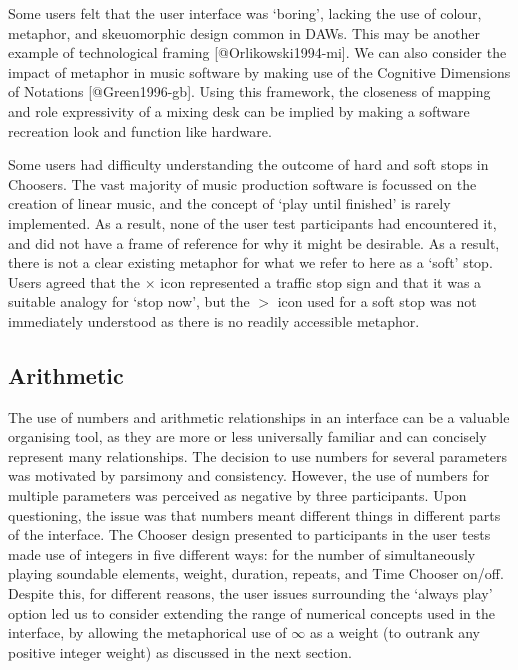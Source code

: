 \documentclass[]{article}
\begin{document}
Some users felt that the user interface was `boring', lacking the use of
colour, metaphor, and skeuomorphic design common in DAWs. This may be
another example of technological framing {[}@Orlikowski1994-mi{]}. We
can also consider the impact of metaphor in music software by making use
of the Cognitive Dimensions of Notations {[}@Green1996-gb{]}. Using this
framework, the closeness of mapping and role expressivity of a mixing
desk can be implied by making a software recreation look and function
like hardware.

Some users had difficulty understanding the outcome of hard and soft
stops in Choosers. The vast majority of music production software is
focussed on the creation of linear music, and the concept of `play until
finished' is rarely implemented. As a result, none of the user test
participants had encountered it, and did not have a frame of reference
for why it might be desirable. As a result, there is not a clear
existing metaphor for what we refer to here as a `soft' stop. Users
agreed that the \(\times\) icon represented a traffic stop sign and that
it was a suitable analogy for `stop now', but the \(>\) icon used for a
soft stop was not immediately understood as there is no readily
accessible metaphor.

\hypertarget{sec:arithmetic}{%
\subsection{Arithmetic}\label{sec:arithmetic}}

The use of numbers and arithmetic relationships in an interface can be a
valuable organising tool, as they are more or less universally familiar
and can concisely represent many relationships. The decision to use
numbers for several parameters was motivated by parsimony and
consistency. However, the use of numbers for multiple parameters was
perceived as negative by three participants. Upon questioning, the issue
was that numbers meant different things in different parts of the
interface. The Chooser design presented to participants in the user
tests made use of integers in five different ways: for the number of
simultaneously playing soundable elements, weight, duration, repeats,
and Time Chooser on/off. Despite this, for different reasons, the user
issues surrounding the `always play' option led us to consider extending
the range of numerical concepts used in the interface, by allowing the
metaphorical use of \(\infty\) as a weight (to outrank any positive
integer weight) as discussed in the next section.
\end{document}

